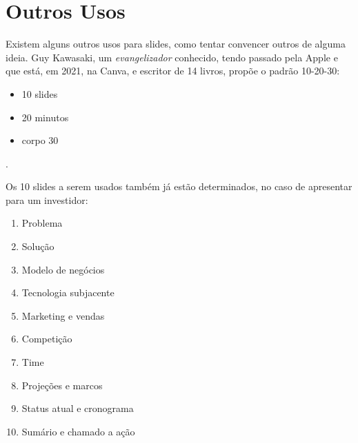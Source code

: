 \section{Outros Usos}

Existem alguns outros usos para slides, como tentar convencer outros de alguma ideia. Guy Kawasaki, um \textit{evangelizador} conhecido, tendo passado pela Apple e que está, em 2021, na Canva, e escritor de 14 livros, propõe o padrão 10-20-30:
\begin{itemize}
    \item 10 slides
    \item 20 minutos
    \item corpo 30
\end{itemize}.

Os 10 slides a serem usados também já estão determinados, no caso de apresentar para um investidor:
\begin{enumerate}
    \item Problema
    \item Solução
    \item Modelo de negócios
    \item Tecnologia subjacente
    \item Marketing e vendas
    \item Competição
    \item Time
    \item Projeções e marcos
    \item Status atual e cronograma
    \item Sumário e chamado a ação
\end{enumerate}